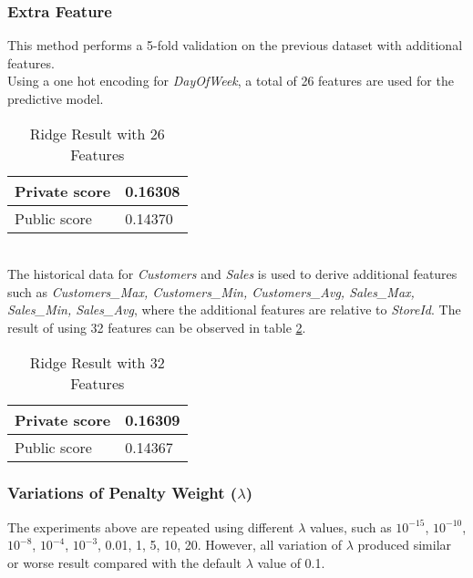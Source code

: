 \subsubsection{Extra Feature}
This method performs a 5-fold validation on the previous dataset with additional features.
\\
Using a one hot encoding for \textit{DayOfWeek}, a total of 26 features are used for the predictive model.
\begin{table}[h]
	\centering
	\caption{Ridge Result with 26 Features}
	\label{tab:ridge_extra_feature_1}
	\begin{tabular}{|m{100pt}|m{50pt}|}
		\hline
		Private score & 0.16308 \\ \hline
		Public score  & 0.14370 \\ \hline
	\end{tabular}
\end{table}
\\
The historical data for \textit{Customers} and \textit{Sales} is used to derive additional features such as \textit{Customers\_Max, Customers\_Min, Customers\_Avg, Sales\_Max, Sales\_Min, Sales\_Avg}, where the additional features are relative to \textit{StoreId}. The result of using 32 features can be observed in table \ref{tab:ridge_extra_feature_2}.
\begin{table}[h]
	\centering
	\caption{Ridge Result with 32 Features}
	\label{tab:ridge_extra_feature_2}
	\begin{tabular}{|m{100pt}|m{50pt}|}
		\hline
		Private score & 0.16309 \\ \hline
		Public score  & 0.14367 \\ \hline
	\end{tabular}
\end{table}

\subsubsection{Variations of Penalty Weight ($\lambda$)}
The experiments above are repeated using different $\lambda$ values, such as $10^{-15}$, $10^{-10}$, $10^{-8}$, $10^{-4}$, $10^{-3}$, 0.01, 1, 5, 10, 20.
However, all variation of $\lambda$ produced similar or worse result compared with the default $\lambda$ value of 0.1.
